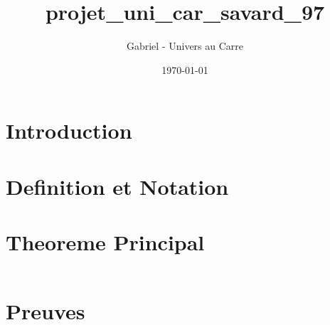 \documentclass[12pt]{article}
\title{projet_uni_car_savard_97}
\author{Gabriel - Univers au Carre}
\date{\today}
\begin{document}
\maketitle


\section{Introduction}



\section{Definition et Notation}



\section{Theoreme Principal}


\begin{equation}
\end{equation}


\section{Preuves}


\end{document}
